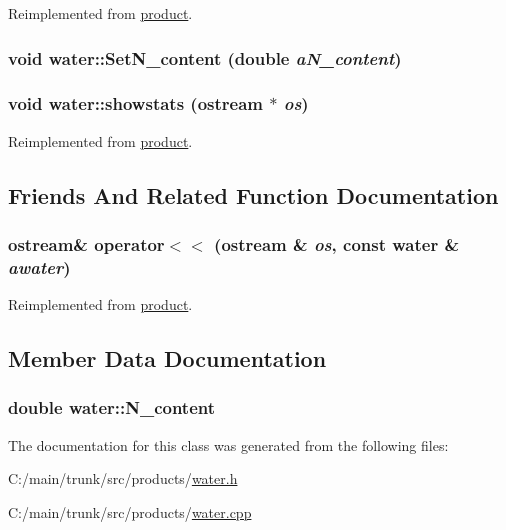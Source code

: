 Reimplemented from \hyperlink{classproduct_a1edb3e3d0619a2db8b8f1c95fed582ce}{product}.\hypertarget{classwater_a7380d9cbf2fc3be1d200b9583267c4ba}{
\subsubsection[{SetN\_\-content}]{\setlength{\rightskip}{0pt plus 5cm}void water::SetN\_\-content (double {\em aN\_\-content})}}
\label{classwater_a7380d9cbf2fc3be1d200b9583267c4ba}
\hypertarget{classwater_a9f619e4772b1c0cb803e9595d680bcfe}{
\subsubsection[{showstats}]{\setlength{\rightskip}{0pt plus 5cm}void water::showstats (ostream $\ast$ {\em os})}}
\label{classwater_a9f619e4772b1c0cb803e9595d680bcfe}


Reimplemented from \hyperlink{classproduct_a1151ea416ab90047f8d087be57a6d7b1}{product}.

\subsection{Friends And Related Function Documentation}
\hypertarget{classwater_a15586d88be7472f0d54983093d7feec7}{
\subsubsection[{operator$<$$<$}]{\setlength{\rightskip}{0pt plus 5cm}ostream\& operator$<$$<$ (ostream \& {\em os}, \/  const {\bf water} \& {\em awater})}}
\label{classwater_a15586d88be7472f0d54983093d7feec7}


Reimplemented from \hyperlink{classproduct_a1b6bf2f2c82a18a17907ee1192fd94bb}{product}.

\subsection{Member Data Documentation}
\hypertarget{classwater_a1e8413dfcf679b03f1855e8040e3234a}{
\subsubsection[{N\_\-content}]{\setlength{\rightskip}{0pt plus 5cm}double {\bf water::N\_\-content}}}
\label{classwater_a1e8413dfcf679b03f1855e8040e3234a}


The documentation for this class was generated from the following files:\begin{DoxyCompactItemize}
\item 
C:/main/trunk/src/products/\hyperlink{water_8h}{water.h}\item 
C:/main/trunk/src/products/\hyperlink{water_8cpp}{water.cpp}\end{DoxyCompactItemize}
